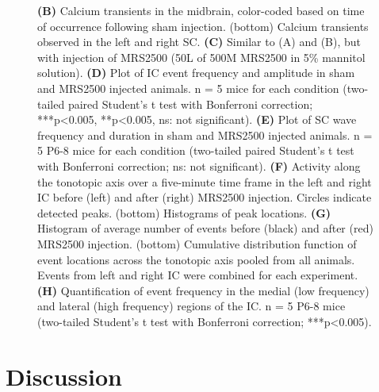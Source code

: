 \documentclass[9pt,lineno]{elife}
\begin{document}
\begin{figure} [t!]
\begin{fullwidth}
\caption{\textbf{(B)} Calcium transients in the midbrain, color-coded based on time of occurrence following sham injection. (bottom) Calcium transients observed in the left and right SC. 
\textbf{(C)} Similar to (A) and (B), but with injection of MRS2500 (50\textmu L of 500\textmu M MRS2500 in 5\% mannitol solution). 
\textbf{(D)} Plot of IC event frequency and amplitude in sham and MRS2500 injected animals. n = 5 mice for each condition (two-tailed paired Student’s t test with Bonferroni correction; ***p<0.005, **p<0.005, ns: not significant).
\textbf{(E)} Plot of SC wave frequency and duration in sham and MRS2500 injected animals. n = 5 P6-8 mice for each condition (two-tailed paired Student’s t test with Bonferroni correction; ns: not significant).
\textbf{(F)} Activity along the tonotopic axis over a five-minute time frame in the left and right IC before (left) and after (right) MRS2500 injection. Circles indicate detected peaks. (bottom) Histograms of peak locations.
\textbf{(G)} Histogram of average number of events before (black) and after (red) MRS2500 injection. (bottom) Cumulative distribution function of event locations across the tonotopic axis pooled from all animals. Events from left and right IC were combined for each experiment.
\textbf{(H)} Quantification of event frequency in the medial (low frequency) and lateral (high frequency) regions of the IC. n = 5 P6-8 mice (two-tailed Student's t test with Bonferroni correction; ***p<0.005).}
\end{fullwidth}
\end{figure}

\section{Discussion}
\end{document}
